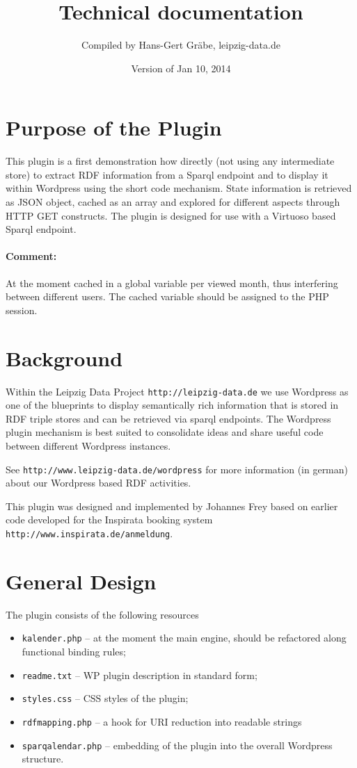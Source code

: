 \documentclass[11pt,a4paper]{article}
\title{Technical documentation}
\author{Compiled by Hans-Gert Gr\"abe, leipzig-data.de}
\date{Version of Jan 10, 2014}
\newcommand{\comment}[1]{\par\paragraph{Comment:} #1}
\begin{document}
\maketitle

\section{Purpose of the Plugin}

This plugin is a first demonstration how directly (not using any intermediate
store) to extract RDF information from a Sparql endpoint and to display it
within Wordpress using the short code mechanism.  State information is
retrieved as JSON object, cached as an array and explored for different
aspects through HTTP GET constructs. The plugin is designed for use with a
Virtuoso based Sparql endpoint.

\comment{At the moment cached in a global variable per viewed month, thus
  interfering between different users. The cached variable should be assigned
  to the PHP session. }

\section{Background}

Within the Leipzig Data Project \texttt{http://leipzig-data.de} we use
Wordpress as one of the blueprints to display semantically rich information
that is stored in RDF triple stores and can be retrieved via sparql endpoints.
The Wordpress plugin mechanism is best suited to consolidate ideas and share
useful code between different Wordpress instances.

See \texttt{http://www.leipzig-data.de/wordpress} for more information (in
german) about our Wordpress based RDF activities.

This plugin was designed and implemented by Johannes Frey based on earlier
code developed for the Inspirata booking system
\texttt{http://www.inspirata.de/anmeldung}.

\section{General Design}

The plugin consists of the following resources
\begin{itemize}       
\item \texttt{kalender.php} -- at the moment the main engine, should be
  refactored along functional binding rules;
\item \texttt{readme.txt} -- WP plugin description in standard form;
\item \texttt{styles.css} -- CSS styles of the plugin;
\item \texttt{rdfmapping.php} -- a hook for URI reduction into readable
  strings
\item \texttt{sparqalendar.php} -- embedding of the plugin into the overall
  Wordpress structure.
\end{itemize}
\end{document}
